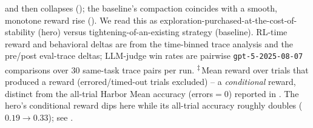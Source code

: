 \begin{table}[t!]
{and then collapses (); the baseline's compaction coincides with a
smooth, monotone reward rise (). We read this as
exploration-purchased-at-the-cost-of-stability (hero) versus tightening-of-an-existing
strategy (baseline). RL-time reward and behavioral deltas are from the time-binned trace
analysis and the pre/post eval-trace deltas; LLM-judge win rates are pairwise
\texttt{gpt-5-2025-08-07} comparisons over $30$ same-task trace pairs per run.
\textsuperscript{$\ddagger$}\,Mean reward over trials that produced a reward (errored/timed-out trials excluded) -- a \emph{conditional} reward, distinct from the all-trial Harbor Mean accuracy (errors$=0$) reported in . The hero's conditional reward dips here while its all-trial accuracy roughly doubles ($0.19\!\to\!0.33$); see .}
\label{tab:rl_behavior_hero_vs_baseline}
\end{table}
